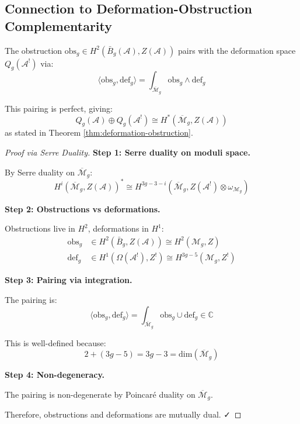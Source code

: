 \subsection{Connection to Deformation-Obstruction Complementarity}
\label{subsec:obstruction-deformation-connection}

\begin{theorem}\label{thm:obs-def-pairing-explicit}
The obstruction $\text{obs}_g \in H^2(\bar{B}_g(\mathcal{A}), Z(\mathcal{A}))$ 
pairs with the deformation space $Q_g(\mathcal{A}^!)$ via:
\begin{equation}
\langle \text{obs}_g, \text{def}_g \rangle = \int_{\overline{\mathcal{M}}_g} 
\text{obs}_g \wedge \text{def}_g
\end{equation}

This pairing is perfect, giving:
$$Q_g(\mathcal{A}) \oplus Q_g(\mathcal{A}^!) \cong H^*(\overline{\mathcal{M}}_g, 
Z(\mathcal{A}))$$
as stated in Theorem \ref{thm:deformation-obstruction}.
\end{theorem}

\begin{proof}[Proof via Serre Duality]

\textbf{Step 1: Serre duality on moduli space.}

By Serre duality on $\overline{\mathcal{M}}_g$:
$$H^i(\overline{\mathcal{M}}_g, Z(\mathcal{A}))^* \cong 
H^{3g-3-i}(\overline{\mathcal{M}}_g, Z(\mathcal{A}^!) \otimes \omega_{\mathcal{M}_g})$$

\textbf{Step 2: Obstructions vs deformations.}

Obstructions live in $H^2$, deformations in $H^1$:
\begin{align}
\text{obs}_g &\in H^2(\bar{B}_g, Z(\mathcal{A})) \cong H^2(\mathcal{M}_g, Z) \\
\text{def}_g &\in H^1(\Omega(\mathcal{A}^!), Z^!) \cong H^{3g-5}(\mathcal{M}_g, Z^!)
\end{align}

\textbf{Step 3: Pairing via integration.}

The pairing is:
$$\langle \text{obs}_g, \text{def}_g \rangle = \int_{\overline{\mathcal{M}}_g} 
\text{obs}_g \cup \text{def}_g \in \mathbb{C}$$

This is well-defined because:
$$2 + (3g-5) = 3g-3 = \text{dim}(\overline{\mathcal{M}}_g)$$

\textbf{Step 4: Non-degeneracy.}

The pairing is non-degenerate by Poincaré duality on $\overline{\mathcal{M}}_g$.

Therefore, obstructions and deformations are mutually dual. ✓
\end{proof}

